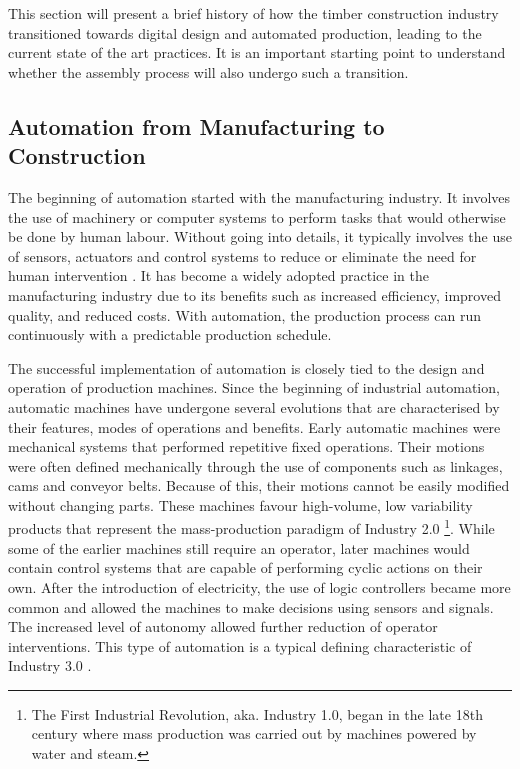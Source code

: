 This section will present a brief history of how the timber construction industry transitioned towards digital design and automated production, leading to the current state of the art practices. It is an important starting point to understand whether the assembly process will also undergo such a transition. 

\subsection{Automation from Manufacturing to Construction}
\label{subsection:introduction-automation-from-manufacturing-to-construction}

The beginning of automation started with the manufacturing industry. It involves the use of machinery or computer systems to perform tasks that would otherwise be done by human labour. Without going into details, it typically involves the use of sensors, actuators and control systems to reduce or eliminate the need for human intervention \parencite{nofSpringerHandbookAutomation2009}. It has become a widely adopted practice in the manufacturing industry due to its benefits such as increased efficiency, improved quality, and reduced costs. With automation, the production process can run continuously with a predictable production schedule.

The successful implementation of automation is closely tied to the design and operation of production machines. Since the beginning of industrial automation, automatic machines have undergone several evolutions that are characterised by their features, modes of operations and benefits. Early automatic machines were mechanical systems that performed repetitive fixed operations. Their motions were often defined mechanically through the use of components such as linkages, cams and conveyor belts. Because of this, their motions cannot be easily modified without changing parts. These machines favour high-volume, low variability products that represent the mass-production paradigm of Industry 2.0
\footnote{ The First Industrial Revolution, aka. Industry 1.0, began in the late 18th century where mass production was carried out by machines powered by water and steam.}.
While some of the earlier machines still require an operator, later machines would contain control systems that are capable of performing cyclic actions on their own. After the introduction of electricity, the use of logic controllers became more common and allowed the machines to make decisions using sensors and signals. The increased level of autonomy allowed further reduction of operator interventions. This type of automation is a typical defining characteristic of Industry 3.0 \parencite{mengesNewCyberPhysicalMaking2015,yinEvolutionProductionSystems2018}. 

